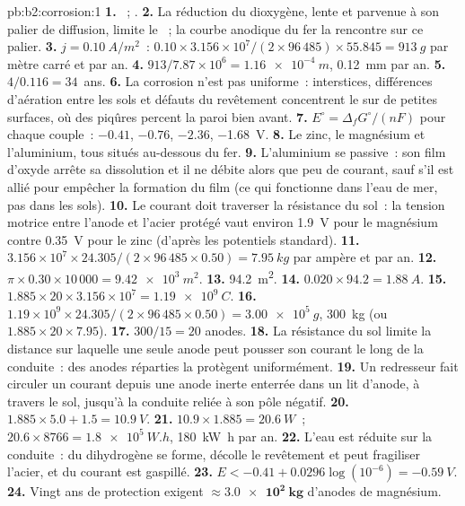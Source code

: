 \begin{solution}{pb:b2:corrosion:1}
\textbf{1.} ~; .
\textbf{2.} La réduction du dioxygène, lente et parvenue à son palier de diffusion,
limite le ~; la courbe anodique du fer la rencontre sur ce palier.
\textbf{3.} $j = \qty{0.10}{A/m^2}$~: $0.10 \times 3.156 \times 10^7/(2 \times 96\,485)
\times 55.845 = \qty{913}{g}$ par mètre carré et par an.
\textbf{4.} $913/7.87 \times 10^6 = \qty{1.16e-4}{m}$, \qty{0.12}{mm} par an.
\textbf{5.} $4/0.116 = 34$~ans.
\textbf{6.} La corrosion n'est pas uniforme~: interstices, différences d'aération
entre les sols et défauts du revêtement concentrent le  sur
de petites surfaces, où des piqûres percent la paroi bien avant.
\textbf{7.} $E^\circ = \Delta_f G^\circ/(nF)$ pour chaque couple~:  $-0.41$,  $-0.76$,
 $-2.36$,  \qty{-1.68}{V}.
\textbf{8.} Le zinc, le magnésium et l'aluminium, tous situés au-dessous du fer.
\textbf{9.} L'aluminium se passive~: son film d'oxyde arrête sa dissolution et il ne
débite alors que peu de courant, sauf s'il est allié pour empêcher la formation du film (ce qui fonctionne
dans l'eau de mer, pas dans les sols).
\textbf{10.} Le courant doit traverser la résistance du sol~: la tension
motrice entre l'anode et l'acier protégé vaut environ \qty{1.9}{V} pour le
magnésium contre \qty{0.35}{V} pour le zinc (d'après les potentiels standard).
\textbf{11.} $3.156 \times 10^7 \times 24.305/(2 \times 96\,485 \times 0.50) =
\qty{7.95}{kg}$ par ampère et par an.
\textbf{12.} $\pi \times 0.30 \times 10\,000 = \qty{9.42e3}{m^2}$.
\textbf{13.} \qty{94.2}{m^2}.
\textbf{14.} $0.020 \times 94.2 = \qty{1.88}{A}$.
\textbf{15.} $1.885 \times 20 \times 3.156 \times 10^7 = \qty{1.19e9}{C}$.
\textbf{16.} $1.19 \times 10^9 \times 24.305/(2 \times 96\,485 \times 0.50) =
\qty{3.00e5}{g}$, \qty{300}{kg} (ou $1.885 \times 20 \times 7.95$).
\textbf{17.} $300/15 = 20$ anodes.
\textbf{18.} La résistance du sol limite la distance sur laquelle une seule anode peut pousser
son courant le long de la conduite~: des anodes réparties la protègent uniformément.
\textbf{19.} Un redresseur fait circuler un courant depuis une anode inerte enterrée dans un lit
d'anode, à travers le sol, jusqu'à la conduite reliée à son pôle négatif.
\textbf{20.} $1.885 \times 5.0 + 1.5 = \qty{10.9}{V}$.
\textbf{21.} $10.9 \times 1.885 = \qty{20.6}{W}$~; $20.6 \times 8766 = \qty{1.8e5}{W.h}$,
\qty{180}{kW.h} par an.
\textbf{22.} L'eau est réduite sur la conduite~: du dihydrogène se forme, décolle le revêtement et
peut fragiliser l'acier, et du courant est gaspillé.
\textbf{23.} $E < -0.41 + 0.0296\log(10^{-6}) = \qty{-0.59}{V}$.
\textbf{24.} Vingt ans de protection exigent $\boldsymbol{\approx \qty{3.0e2}{kg}}$
d'anodes de magnésium.
\end{solution}
